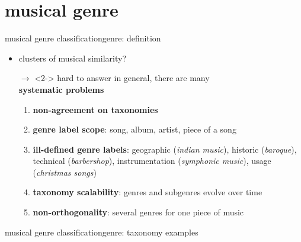     \section[genre]{musical genre}
        \begin{frame}{musical genre classification}{genre: definition}

            \begin{itemize}
                \item   clusters of musical similarity?
                \item[$\rightarrow$]<2->             hard to answer in general, there are many\\ \textbf{systematic problems}
                \smallskip
                    \begin{enumerate}
                        \item<3->	\textbf{non-agreement on taxonomies}
                        \item<3->   \textbf{genre label scope}: song, album, artist, piece of a song
                        \item<3->	\textbf{ill-defined genre labels}: geographic (\textit{indian music}), historic (\textit{baroque}), technical (\textit{barbershop}), instrumentation (\textit{symphonic music}), usage (\textit{christmas songs})
                        \item<3->	\textbf{taxonomy scalability}: genres and subgenres evolve over time
                        \item<3->	\textbf{non-orthogonality}: several genres for one piece of music
                    \end{enumerate}

            \end{itemize}
            
        \end{frame}
        \begin{frame}{musical genre classification}{genre: taxonomy examples}
                \vspace{-20mm}
                \begin{center}
                \scalebox{.6}
                {
                    
                }
                \end{center}
        \end{frame}

